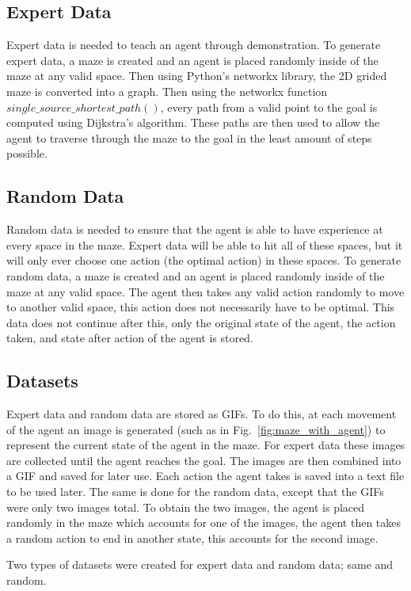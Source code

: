 \documentclass[12pt,american]{report}
\begin{document}
\subsection{Expert Data}
Expert data is needed to teach an agent through demonstration.  To generate expert data, a maze is created and an agent is placed randomly inside of the maze at any valid space. Then using Python's networkx library, the 2D grided maze is converted into a graph.  Then using the networkx function $single\_source\_shortest\_path()$, every path from a valid point to the goal is computed using Dijkstra's algorithm. These paths are then used to allow the agent to traverse through the maze to the goal in the least amount of steps possible.

\subsection{Random Data}
\label{sec:random_data}
Random data is needed to ensure that the agent is able to have experience at every space in the maze.  Expert data will be able to hit all of these spaces, but it will only ever choose one action (the optimal action) in these spaces. To generate random data, a maze is created and an agent is placed randomly inside of the maze at any valid space.  The agent then takes any valid action randomly to move to another valid space, this action does not necessarily have to be optimal. This data does not continue after this, only the original state of the agent, the action taken, and state after action of the agent is stored.

\subsection{Datasets}
Expert data and random data are stored as GIFs.  To do this, at each movement of the agent an image is generated (such as in Fig.~\ref{fig:maze_with_agent}) to represent the current state of the agent in the maze.  For expert data these images are collected until the agent reaches the goal. The images are then combined into a GIF and saved for later use.  Each action the agent takes is saved into a text file to be used later. The same is done for the random data, except that the GIFs were only two images total.  To obtain the two images, the agent is placed randomly in the maze which accounts for one of the images, the agent then takes a random action to end in another state, this accounts for the second image. 

Two types of datasets were created for expert data and random data; same and random.
\end{document}
